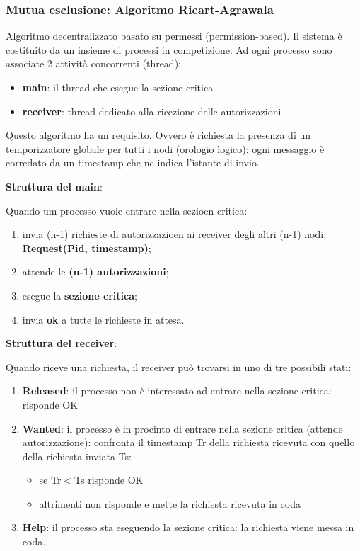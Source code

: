 \documentclass{article}
\begin{document}
\subsubsection{Mutua esclusione: Algoritmo Ricart-Agrawala}

Algoritmo decentralizzato basato su permessi (permission-based). Il sistema è costituito da un insieme di processi in competizione. Ad ogni processo sono associate 2 attività
concorrenti (thread):
\begin{itemize}
    \item \textbf{main}: il thread che esegue la sezione critica
    \item \textbf{receiver}: thread dedicato alla ricezione delle autorizzazioni
\end{itemize}

\vspace{3mm}
Questo algoritmo ha un requisito. Ovvero è richiesta la presenza di un temporizzatore globale per tutti i nodi (orologio logico): ogni messaggio è corredato da un timestamp che ne indica l'istante di invio.

\vspace{3mm}
\textbf{Struttura del main}:

Quando um processo vuole entrare nella sezioen critica:
\begin{enumerate}
    \item invia (n-1) richieste di autorizzazioen ai receiver degli altri (n-1) nodi: \textbf{Request(Pid, timestamp)};
    \item attende le \textbf{(n-1) autorizzazioni};
    \item esegue la \textbf{sezione critica};
    \item invia \textbf{ok} a tutte le richieste in attesa.
\end{enumerate}

\vspace{3mm}
\textbf{Struttura del receiver}:

Quando riceve una richiesta, il receiver può trovarsi in uno di tre possibili stati:
\begin{enumerate}
    \item \textbf{Released}: il processo non è interessato ad entrare nella sezione critica: risponde OK
    \item \textbf{Wanted}: il processo è in procinto di entrare nella sezione critica (attende autorizzazione): confronta il timestamp Tr della richiesta ricevuta con quello della richiesta inviata Ts:
    \begin{itemize}
        \item se Tr$<$Ts risponde OK
        \item altrimenti non risponde e mette la richiesta ricevuta in coda
    \end{itemize}
    \item \textbf{Help}: il processo sta eseguendo la sezione critica: la richiesta viene messa in coda.
\end{enumerate}
\end{document}
